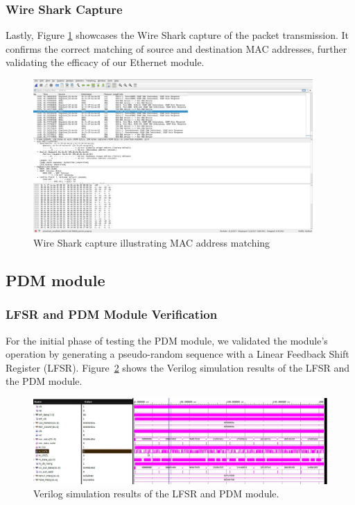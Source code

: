 \subsubsection{Wire Shark Capture}
Lastly, Figure \ref{fig:wireshark_capture} showcases the Wire Shark capture of the packet transmission. It confirms the correct matching of source and destination MAC addresses, further validating the efficacy of our Ethernet module.

\begin{figure}[h]
    \centering
    \includegraphics[width=0.95\textwidth]{Sections/RESULTS/Images/wireshark_capture.jpg}
    \caption{Wire Shark capture illustrating MAC address matching}
    \label{fig:wireshark_capture}
\end{figure}





\subsection{PDM module}




\subsubsection{LFSR and PDM Module Verification}
For the initial phase of testing the PDM module, we validated the module's operation by generating a pseudo-random sequence with a Linear Feedback Shift Register (LFSR). Figure~\ref{fig:lsfr_pdm_simulation} shows the Verilog simulation results of the LFSR and the PDM module.

\begin{figure}[h!]
\centering
\includegraphics[width=.95\linewidth]{Sections/RESULTS/Images/verilog-tb-pdm-lsfr.png}
\caption{Verilog simulation results of the LFSR and PDM module.}
\label{fig:lsfr_pdm_simulation}
\end{figure}



